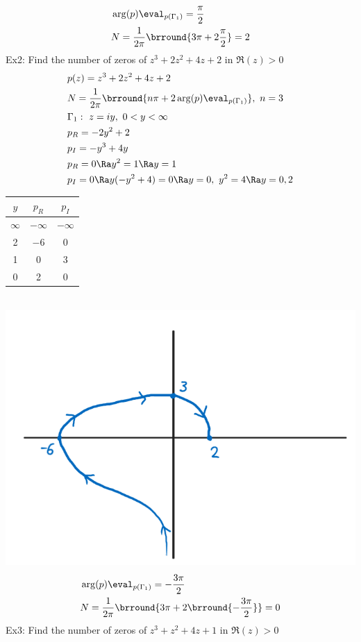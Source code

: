 \begin{align*}
    &\arg(p)\eval_{p(\Gamma_1)}=\frac{\pi}{2}\\
    &N=\frac{1}{2\pi}\brround{3\pi+2\frac{\pi}{2}}=2
\end{align*}
Ex2: Find the number of zeros of $z^3+2z^2+4z+2$ in $\Re(z)>0$
\begin{align*}
    &p(z)=z^3+2z^2+4z+2\\
    &N=\frac{1}{2\pi}\brround{n\pi+2\arg(p)\eval_{p(\Gamma_1)}},\ n=3\\
    &\Gamma_1:\ z=iy,\ 0<y<\infty\\
    &p_R=-2y^2+2\\
    &p_I=-y^3+4y\\
    &p_R=0\Ra y^2=1\Ra y=1\\
    &p_I=0\Ra y(-y^2+4)=0\Ra y=0,\ y^2=4\Ra y=0,2
\end{align*}
\begin{tabular}{c|c|c}
    $y$ & $p_R$ & $p_I$\\
    \hline
    $\infty$ & $-\infty$ & $-\infty$\\
    2 & $-6$ & 0\\
    1 & 0 & 3\\
    0 & 2 & 0
\end{tabular}\\
\includegraphics[scale=0.5]{Images/ComplexAnalysisPictures/Q6.png}
\begin{align*}
    &\arg(p)\eval_{p(\Gamma_1)}=-\frac{3\pi}{2}\\
    &N=\frac{1}{2\pi}\brround{3\pi+2\brround{-\frac{3\pi}{2}}}=0
\end{align*}
Ex3: Find the number of zeros of $z^3+z^2+4z+1$ in $\Re(z)>0$
